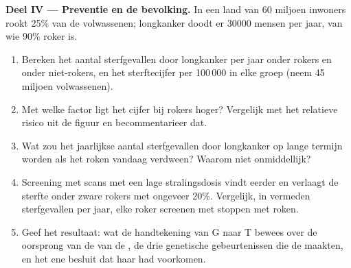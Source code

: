 \begin{problem}
\medskip
\noindent\textbf{Deel IV --- Preventie en de bevolking.}
In een land van 60 miljoen inwoners rookt 25\% van de volwassenen;
longkanker doodt er $\num{30000}$ mensen per jaar, van wie 90\% roker is.
\begin{enumerate}[resume]
  \item Bereken het aantal sterfgevallen door longkanker per jaar onder
        rokers en onder niet-rokers, en het sterftecijfer per 100\,000 in
        elke groep (neem 45 miljoen volwassenen).
  \item Met welke factor ligt het cijfer bij rokers hoger? Vergelijk met
        het relatieve risico uit de figuur en becommentarieer dat.
  \item Wat zou het jaarlijkse aantal sterfgevallen door longkanker op
        lange termijn worden als het roken vandaag verdween? Waarom niet
        onmiddellijk?
  \item Screening met scans met een lage stralingsdosis vindt 
        eerder en verlaagt de sterfte onder zware rokers met ongeveer
        20\%. Vergelijk, in vermeden sterfgevallen per jaar, elke roker
        screenen met stoppen met roken.
  \item Geef het resultaat: wat de handtekening van G naar T bewees over
        de oorsprong van de  van de , de drie genetische
        gebeurtenissen die de  maakten, en het ene besluit dat haar
        had voorkomen.
\end{enumerate}
\end{problem}
